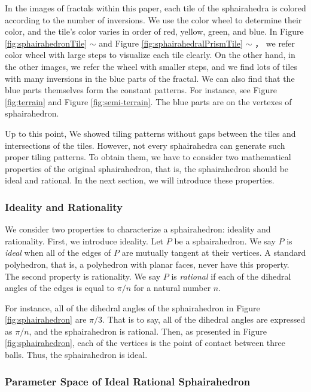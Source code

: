 In the images of fractals within this paper, each tile of the
sphairahedra is colored according to the
number of inversions.
We use the color wheel to determine their color,
and the tile's color varies in order of red, yellow, green, and blue.
In Figure \ref{fig:sphairahedronTile} $\sim$
 and
Figure \ref{fig:sphairahedralPrismTile}
$\sim$ ，
we refer color wheel with large steps to visualize each tile clearly.
On the other hand, in the other images, we refer the wheel with smaller
steps, and we find lots of tiles with many inversions in the blue
parts of the fractal.
We can also find that the blue parts themselves form the constant
patterns.
For instance, see Figure \ref{fig:terrain} and Figure \ref{fig:semi-terrain}.
The blue parts are on the vertexes of sphairahedron.

Up to this point, We showed tiling patterns without gaps between the tiles and
intersections of the tiles.
However, not every sphairahedra can generate such proper tiling patterns.
To obtain them, we have to consider two mathematical properties
of the original sphairahedron, that is, the sphairahedron should be
ideal and rational.
In the next section, we will introduce these properties.

\subsubsection{Ideality and Rationality}

We consider two properties to characterize a sphairahedron:
ideality and rationality.
First, we introduce ideality.
Let $P$ be a sphairahedron. We say $P$ is \textit{ideal} when all of the edges of
$P$ are mutually tangent at their vertices.
A standard polyhedron, that is, a polyhedron with planar faces, never have this property.
The second property is rationality.
We say $P$ is \textit{rational} if each of the
dihedral angles of the edges is equal to $\pi / n$ for a natural number
$n$.

For instance, all of the dihedral angles of the sphairahedron
in Figure \ref{fig:sphairahedron} are $\pi / 3$.
That is to say, all of the dihedral angles are expressed as
$\pi /n$, and the sphairahedron is rational.
Then, as presented in Figure
\ref{fig:sphairahedron}, each of the vertices is
the point of contact between three balls.
Thus, the sphairahedron is ideal.

\subsubsection{Parameter Space of Ideal Rational Sphairahedron}

